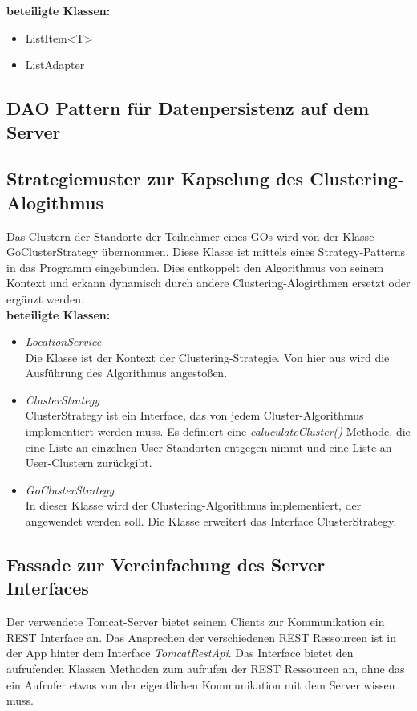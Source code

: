 \documentclass[11pt,a4paper]{report}
\begin{document}
\textbf{beteiligte Klassen:}
\begin{itemize}
	\item ListItem<T>
	\item ListAdapter
\end{itemize}

\subsection{DAO Pattern für Datenpersistenz auf dem Server}

\subsection{Strategiemuster zur Kapselung des Clustering-Alogithmus}
Das Clustern der Standorte der Teilnehmer eines GOs wird von der Klasse GoClusterStrategy übernommen. Diese Klasse ist mittels eines Strategy-Patterns in das Programm eingebunden. Dies entkoppelt den Algorithmus von seinem Kontext und erkann dynamisch durch andere Clustering-Alogirthmen ersetzt oder ergänzt werden. \\

\textbf{beteiligte Klassen:}
\begin{itemize}
	\item \textit{LocationService} \\
	Die Klasse ist der Kontext der Clustering-Strategie. Von hier aus wird die Ausführung des Algorithmus angestoßen.
	\item \textit{ClusterStrategy} \\
	ClusterStrategy ist ein Interface, das von jedem Cluster-Algorithmus implementiert werden muss. Es definiert eine \textit{caluculateCluster()} Methode, die eine Liste an einzelnen User-Standorten entgegen nimmt und eine Liste an User-Clustern zurückgibt.
	\item \textit{GoClusterStrategy} \\
	In dieser Klasse wird der Clustering-Algorithmus implementiert, der angewendet werden soll. Die Klasse erweitert das Interface ClusterStrategy.
\end{itemize}

\subsection{Fassade zur Vereinfachung des Server Interfaces}
Der verwendete Tomcat-Server bietet seinem Clients zur Kommunikation ein REST Interface an. Das Ansprechen der verschiedenen REST Ressourcen ist in der App hinter dem Interface \textit{TomcatRestApi}. Das Interface bietet den aufrufenden Klassen Methoden zum aufrufen der REST Ressourcen an, ohne das ein Aufrufer etwas von der eigentlichen Kommunikation mit dem Server wissen muss. \\
\end{document}
